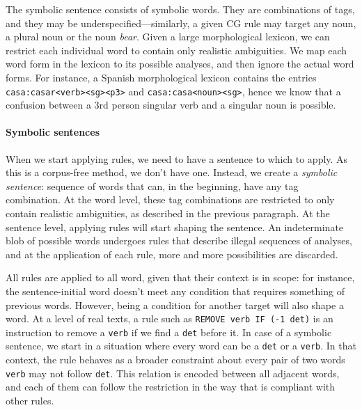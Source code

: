 The symbolic sentence consists of symbolic words.
They are combinations of tags, and they may be underspecified---similarly, a given CG rule may target any noun, a plural noun or the noun \emph{bear}.
Given a large morphological lexicon, we can restrict each individual word to contain only realistic ambiguities. We map each word form in the lexicon to its possible analyses, and then ignore the actual word forms. For instance, a Spanish morphological lexicon contains the entries \texttt{casa:casar<verb><sg><p3>} and \texttt{casa:casa<noun><sg>}, hence we know that a confusion between a 3rd person singular verb and a singular noun is possible. 


\paragraph{Symbolic sentences}

When we start applying rules, we need to have a sentence to which to apply.
As this is a corpus-free method, we don't have one.
Instead, we create a \emph{symbolic sentence}: sequence of words that can, in the beginning, have any tag combination.
At the word level, these tag combinations are restricted to only contain realistic ambiguities, as described in the previous paragraph.
At the sentence level, applying rules will start shaping the sentence.
An indeterminate blob of possible words undergoes rules that describe illegal sequences of analyses,
and at the application of each rule, more and more possibilities are discarded.

All rules are applied to all word, given that their context is in scope: for instance, the sentence-initial word doesn't meet any condition that requires something of previous words.
However, being a condition for another target will also shape a word.
At a level of real texts, a rule such as \texttt{REMOVE verb IF (-1 det)} is an instruction to remove a \texttt{verb} if we find a \texttt{det} before it.
In case of a symbolic sentence, we start in a situation where every word can be a \texttt{det} or a \texttt{verb}. In that context, the rule behaves as a broader constraint about every pair of two words \texttt{verb} may not follow \texttt{det}. This relation is encoded between all adjacent words, and each of them can follow the restriction in the way that is compliant with other rules.

